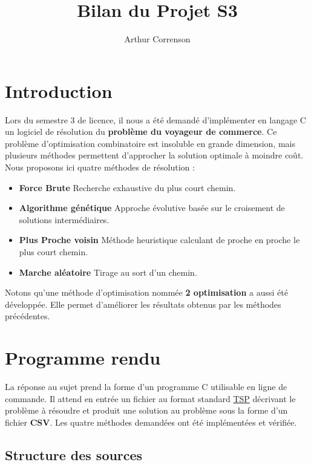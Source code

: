\documentclass[11pt]{article}
\begin{document}
\title{Bilan du Projet S3}
\author{Arthur Correnson}
\maketitle

\section*{Introduction}

Lors du semestre 3 de licence, il nous a été demandé d'implémenter en langage C un logiciel de résolution du \textbf{problème du voyageur de commerce}. Ce problème d'optimisation combinatoire est insoluble en grande dimension, mais plusieurs méthodes permettent d'approcher la solution optimale à moindre coût. Nous proposons ici quatre méthodes de résolution :

\begin{itemize}
	\item \textbf{Force Brute} 	Recherche exhaustive du plus court chemin.
	\item \textbf{Algorithme génétique} 	Approche évolutive basée sur le croisement de solutions intermédiaires.
	\item \textbf{Plus Proche voisin}	 	Méthode heuristique calculant de proche en proche le plus court chemin.
	\item \textbf{Marche aléatoire} Tirage au sort d'un chemin.
\end{itemize}

Notons qu'une méthode d'optimisation nommée \textbf{2 optimisation} a aussi été développée. Elle permet d'améliorer les résultats obtenus par les méthodes précédentes.

\section*{Programme rendu}

La réponse au sujet prend la forme d'un programme C utilisable en ligne de commande. Il attend en entrée un fichier au format standard \href{http://comopt.ifi.uni-heidelberg.de/software/TSPLIB95/}{TSP} décrivant le problème à résoudre et produit une solution au problème sous la forme d'un fichier \textbf{CSV}. Les quatre méthodes demandées ont été implémentées et vérifiée.

\subsection*{Structure des sources}
\end{document}
